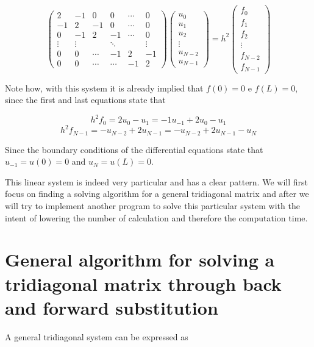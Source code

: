 \documentclass {article}
\begin{document}
\begin{equation}
 \begin{pmatrix}
   2 & -1 &  0 & 0 & \cdots & 0  \\
  -1 &  2 & -1 & 0 & \cdots & 0  \\
   0 &-1 &  2 & -1 & \cdots & 0 \\
  \vdots  & \vdots  & & \ddots & & \vdots   \\
   0 &  0 & \cdots  & -1 & 2 & -1 \\
   0 &  0 & \cdots & \cdots  & -1 & 2
 \end{pmatrix}
 \begin{pmatrix}
  u_0 \\
  u_1 \\
  u_2 \\
  \vdots  \\
  u_{N-2} \\
  u_{N-1} 
 \end{pmatrix}
 = h^2
 \begin{pmatrix}
  f_0 \\
  f_1 \\
  f_2 \\
  \vdots  \\
  f_{N-2} \\
  f_{N-1} 
 \end{pmatrix}
\end{equation}

Note how, with this system it is already implied that $f(0)=0$ e $f(L)=0$, since the first and last equations state that

$$h^2 f_0 = 2 u_0-u_1 = -1 u_{-1}+2 u_0-u_1$$
$$h^2 f_{N-1} = -u_{N-2}+2 u_{N-1} =  -u_{N-2}+2 u_{N-1}-u_N$$ 

Since the boundary conditions of the differential equations state that $u_{-1}=u(0)=0$ and $u_{N}=u(L)=0$.  

This linear system is indeed very particular and has a clear pattern. We will first focus on finding a solving algorithm for a general tridiagonal matrix and after we will try to implement another program to solve this particular system with the intent of lowering the number of calculation and therefore the computation time.

\section{General algorithm for solving a tridiagonal matrix through back and forward substitution}

A general tridiagonal system can be expressed as
\end{document}
